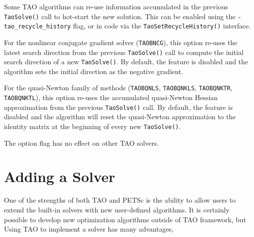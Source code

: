 \documentclass[]{book}
\begin{document}
Some TAO algorithms can re-use information accumulated in the previous 
{\tt TaoSolve()} call to hot-start the new solution. This can be 
enabled using the {\tt -tao\_recycle\_history} flag, or in code via 
the {\tt TaoSetRecycleHistory()} interface.

For the nonlinear conjugate gradient solver ({\tt TAOBNCG}), this 
option re-uses the latest search direction from the previous 
{\tt TaoSolve()} call to compute the initial search direction of a 
new {\tt TaoSolve()}. By default, the feature is disabled and the 
algorithm sets the initial direction as the negative gradient.

For the quasi-Newton family of methods ({\tt TAOBQNLS}, {\tt TAOBQNKLS},
{\tt TAOBQNKTR}, {\tt TAOBQNKTL}), this option re-uses the accumulated 
quasi-Newton Hessian approximation from the previous {\tt TaoSolve()} call.
By default, the feature is disabled and the algorithm will reset the 
quasi-Newton approximation to the identity matrix at the beginning of 
every new {\tt TaoSolve()}.

The option flag has no effect on other TAO solvers.

\chapter{Adding a Solver}
\label{chapter:addsolver}
One of the strengths of both TAO and PETSc is the ability to allow 
users to extend the built-in solvers with new user-defined algorithms.
It is certainly possible to develop new optimization algorithms outside of 
TAO framework, but
Using TAO to implement a solver has many advantages,
\end{document}
